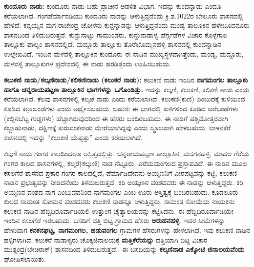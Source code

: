 \textbf{ಕುಂದೂರು ನಾಡು:} ಕುಂದೂರು ನಾಡು ಬಹು ಪ್ರಾಚೀನ ಆಡಳಿತ ವಿಭಾಗ. ಇದನ್ನು ಕುಂದನ್ನಾಡು ಎಂದೂ ಕರೆಯಲಾಗಿದೆ. ಗಂಗಪೆರ್ಮಾನಡಿಯು ಕುಂದೂರು ನಾಡನ್ನು ಆಳುತ್ತಿದ್ದನೆಂದು ಕ್ರಿ.ಶ.1022ರ ಬೇಲೂರು ಶಾಸನದಲ್ಲಿ ಹೇಳಿದೆ. ಕನ್ನಯ್ಯನ ಮಗ ರಾಜೇಂದ್ರ ಚೋಳನು ಕುನ್ದನ್ನಾಡನ್ನು ಆಳುತ್ತಿದ್ದನೆಂದು ಮಂಡ್ಯ ತಾಲೂಕಿನ ಹಳೇಬೂದನೂರು ಶಾಸನದಿಂದ ತಿಳಿದುಬರುತ್ತದೆ. ಕುನ್ದುನಾಟ್ಟು ಗಾಮುಂಡರು, ಕುನ್ದುನಾಡಾಳ್ವ ಪೆರ್ಗ್ಗಡೆಗಳ ವಿಚಾರ ಕೊಳ್ಳೆಗಾಲ ತಾಲ್ಲೂಕು ಪಾಲ್ಯಂ ಶಾಸನದಲ್ಲಿದೆ. ಮದ್ದೂರು ತಾಲ್ಲೂಕು ತೊರೆಬೊಮ್ಮನಹಳ್ಳಿ ಶಾಸನದಲ್ಲಿ ಕುಂದನ್ನಾಡಿನ ಉಲ್ಲೇಖವಿದೆ. ಇಂದಿನ ಮಳವಳ್ಳಿ ತಾಲ್ಲೂಕಿನ ಕುಂದೂರು ಈ ನಾಡಿನ ಮುಖ್ಯಸ್ಥಳವಾಗಿತ್ತೆಂದು, ಮಂಡ್ಯ, ಮದ್ದೂರು, ಮಳವಳ್ಳಿ ತಾಲ್ಲೂಕುಗಳ ಪ್ರದೇಶದಲ್ಲಿ ಈ ನಾಡು ಹರಡಿತ್ತೆಂದು ಊಹಿಸಬಹುದು.

\textbf{ಕಲುಕಣಿ ನಾಡು/ಕಲ್ಕಣಿನಾಡು/ಕಲಿಕಣಿನಾಡು (ಕಲುಕರೆ ನಾಡು):} ಕಲುಕಣಿ ನಾಡು ಇಂದಿನ \textbf{ನಾಗಮಂಗಲ ತಾಲ್ಲೂಕು ಹಾಗೂ ಚನ್ನರಾಯಪಟ್ಟಣ ತಾಲ್ಲೂಕಿನ ಭಾಗಗಳನ್ನು ಒಗೊಂಡಿತ್ತು.} ಇದನ್ನು ಕಲ್ಕಣಿ, ಕಲುಕಣಿ, ಕಲಿಕಣಿ ನಾಡು ಎಂದು ಕರೆಯಲಾಗಿದೆ. ಕೆಲವು ಶಾಸನಗಳಲ್ಲಿ ಕಲ್ಕಱೆ ನಾಡು ಎಂದು ಕರೆಯಲಾಗಿದೆ. ಕಲುಕಣಿ(ಕುಣಿ) ಎಂಬುದಕ್ಕೆ ಕುಳಿಯಿಂದ ಕೂಡಿದ ಕಲ್ಲುಬಂಡೆಗಳು ಎಂದು ಅರ್ಥೈಸಬಹುದು. ಬಹುಶಃ ಈ ಭಾಗದಲ್ಲಿ ಕುಳಿಗಳಿಂದ ಕೂಡಿದ ಅರೆಬಂಡೆಗಳು (ಕಲ್ಲಿನಬೆಟ್ಟ ಗುಡ್ಡಗಳು) ಹೆಚ್ಚಾಗಿರುವುದರಿಂದ ಈ ಹೆಸರು ಬಂದಿರಬಹುದು. ಈ ನಾಡಿಗೆ ಪಶ್ಚಿಮೋತ್ತರವಾಗಿ ಕಬ್ಬಾಹುನಾಡು, ದಕ್ಷಿಣಕ್ಕೆ ಕುರುವಂಕನಾಡು ಮೇರೆಯಾಗಿದ್ದವು ಎಂದು ಸ್ಥೂಲವಾಗಿ ಹೇಳಬಹುದು. ಲಾಳನಕೆರೆ ಶಾಸನದಲ್ಲಿ ಇದನ್ನು “ಕಲುಕಣಿ ಯೆಪ್ಪತ್ತು” ಎಂದು ಕರೆಯಲಾಗಿದೆ.

ಕಲ್ಕಣಿ ನಾಡು ಗಂಗರ ಕಾಲದಿಂದಲೂ ಅಸ್ತಿತ್ವದಲ್ಲಿತ್ತು. ಚನ್ನರಾಯಪಟ್ಟಣ ತಾಲ್ಲೂಕಿನ, ಮಸಗನಹಳ್ಳಿ, ಮಾದಲ ಗೆರೆಯ ಗಂಗರ ಕಾಲದ ಶಾಸನಗಳಲ್ಲಿ, ಕಲ್ಕರೆ(ಕಲ್ಕುಣಿ) ನಾಡ ನೆಟ್ಟೂರು. ಎರೆಯಮಂಗಲದ ಪ್ರಸ್ತಾಪವಿದೆ. ಈ ನಾಡಿನ ಮೂಲ ಕಸಲಗೆರೆ ಶಾಸನದ ಪ್ರಕಾರ ಗಂಗರ ಕಾಲದಲ್ಲಿದೆ, ಪೆರ್ಮಾಡಿದೇವನು ಅಯ್ಕಣನಿಗೆ ವೀರಪಟ್ಟವನ್ನು ಕಟ್ಟಿ, ಕಲುಕಣಿ ನಾಡಿನ ಪ್ರಭುತ್ವವನ್ನು ನೀಡಿದನೆಂದು ತಿಳಿದುಬರುತ್ತದೆ. ಕರಿ ಅಯ್ಕಣನ ವಂಶದವರು ಈ ನಾಡನ್ನು ಆಳುತ್ತಿದ್ದರು. ಕರಿ ಅಯ್ಕಣನ ವಂಶದ ನಾಗ ಎಂಬುವವನಿಂದ ನಾಗಮಂಗಲ ಎಂಬ ಊರು ಅಸ್ತಿತ್ವಕ್ಕೆ ಬಂದಿರಬಹುದು. ಕೂಡಲೂರು ಕುಲದ ಸಾಮಂತ ಸೋಮನ ವಂಶದವರು ಕಲುಕಣಿ ನಾಡನ್ನೂ ಆಳುತ್ತಿದ್ದರು. ಸಾಮಂತ ಸೋಮೆಯ ನಾಯಕನು ಕಲುಕಣಿ ನಾಡಿನ ಹೆಬ್ಬಿದಿರೂರ್ವಾಡಿಯಲಿ ಉತ್ತುಂಗ ಚೈತ್ಯಾಲಯವನ್ನು ಕಟ್ಟಿಸಿದನು. ಈ ಹೆಬ್ಬಿದಿರೂರ್ವಾಡಿಯೇ ಇಂದಿನ ಕಸಲಗೆರೆ ಇರಬಹುದು. ಬಸದಿಗೆ ದತ್ತಿ ಬಿಟ್ಟ ಗ್ರಾಮದ ಹೆಸರು \textbf{ಅರುಹನಹಳ್ಳಿ}. ಇದರ ಸೀಮೆಗಳನ್ನು ಹೇಳುವಾಗ \textbf{ಕನಕನಘಟ್ಟ, ನಾಗಮಂಗಲ, ಹಡುವಂಗಲ} ಗ್ರಾಮಗಳ ಹೆಸರುಗಳನ್ನು ಹೇಳಲಾಗಿದೆ. ಇವು ಕಲುಕಣಿ ನಾಡಿನ ಹಳ್ಳಿಗಳಾಗಿವೆ. ಕಲುಕರೆ ನಾಡಾಳ್ವರು ಚೊಕ್ಕಜಿನಾಲಯಕ್ಕೆ \textbf{ಮತ್ತಿಕೆರೆಯನ್ನು} ದತ್ತಿಯಾಗಿ ಬಿಟ್ಟ ವಿಚಾರ ಮುತ್ಸಂದ್ರ(ಬೇಚಿರಾಕ್​) ಶಾಸನದಿಂದ ತಿಳಿದುಬರುತ್ತದೆ.. ಈ ಬಸದಿಯನ್ನು \textbf{ಕಲ್ಕಣಿನಾಡ ಎಕ್ಕೋಟಿ ಜಿನಾಲಯವೆಂದು} ಘೋಷಿಸಲಾಯಿತು.

